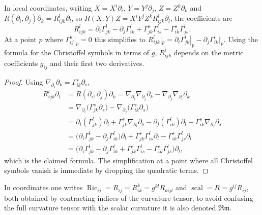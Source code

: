\begin{proposition}
  \label{prop:pet-ch3-curvature-coordinate-formula}
  \leanok
  In local coordinates, writing $X=X^i\partial_i$, $Y=Y^j\partial_j$,
  $Z=Z^k\partial_k$ and $R(\partial_i,\partial_j)\partial_k=R^l_{ijk}\partial_l$, so
  $R(X,Y)Z=X^iY^jZ^kR^l_{ijk}\partial_l$, the coefficients are
  \[
    R^l_{ijk}=\partial_i\Gamma^l_{jk}-\partial_j\Gamma^l_{ik}
    +\Gamma^s_{jk}\Gamma^l_{is}-\Gamma^s_{ik}\Gamma^l_{js}.
  \]
  At a point $p$ where $\Gamma^k_{ij}|_p=0$ this simplifies to
  $R^l_{ijk}|_p=\partial_i\Gamma^l_{jk}|_p-\partial_j\Gamma^l_{ik}|_p$. Using the
  formula for the Christoffel symbols in terms of $g$, $R^l_{ijk}$ depends on the
  metric coefficients $g_{ij}$ and their first two derivatives.
\end{proposition}
\begin{proof}
  \leanok
  Using $\nabla_{\partial_i}\partial_k=\Gamma^s_{ik}\partial_s$,
  \begin{align*}
    R^l_{ijk}\partial_l&=R(\partial_i,\partial_j)\partial_k
    =\nabla_{\partial_i}\nabla_{\partial_j}\partial_k-\nabla_{\partial_j}\nabla_{\partial_i}\partial_k\\
    &=\nabla_{\partial_i}\big(\Gamma^s_{jk}\partial_s\big)-\nabla_{\partial_j}\big(\Gamma^s_{ik}\partial_s\big)\\
    &=\partial_i(\Gamma^l_{jk})\partial_l+\Gamma^s_{jk}\nabla_{\partial_i}\partial_s
      -\partial_j(\Gamma^l_{ik})\partial_l-\Gamma^s_{ik}\nabla_{\partial_j}\partial_s\\
    &=\big(\partial_i\Gamma^l_{jk}-\partial_j\Gamma^l_{ik}\big)\partial_l
      +\Gamma^s_{jk}\Gamma^l_{is}\partial_l-\Gamma^s_{ik}\Gamma^l_{js}\partial_l\\
    &=\big(\partial_i\Gamma^l_{jk}-\partial_j\Gamma^l_{ik}+\Gamma^s_{jk}\Gamma^l_{is}-\Gamma^s_{ik}\Gamma^l_{js}\big)\partial_l,
  \end{align*}
  which is the claimed formula. The simplification at a point where all
  Christoffel symbols vanish is immediate by dropping the quadratic terms.
\end{proof}

\begin{remark}
  \label{rem:pet-ch3-ricci-scalar-index-notation}
  \leanok
  In coordinates one writes $\operatorname{Ric}_{ij}=R_{ij}=R^k_{ik}=g^{kl}R_{kijl}$ and
  $\operatorname{scal}=R=g^{ij}R_{ij}$, both obtained by contracting indices of the curvature
  tensor; to avoid confusing the full curvature tensor with the scalar curvature
  it is also denoted $\mathfrak{Rm}$.
\end{remark}

